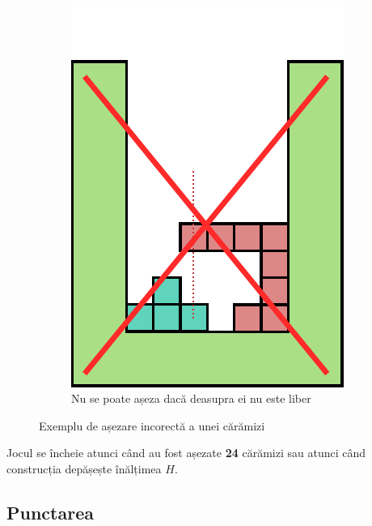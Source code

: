 \documentclass[12pt]{article}
\begin{document}
\begin{figure}[h!]
\begin{subfigure}[t]{0.25\textwidth}
        \end{subfigure}%
        \qquad
        ~ %
        \begin{subfigure}[t]{0.25\textwidth}
                \includegraphics[width=\textwidth]{graphics/placenewB.pdf}
                \caption{Nu se poate așeza dacă deasupra ei nu este liber}
                \label{fig:incorrectB}
        \end{subfigure}%
        \caption{Exemplu de așezare incorectă a unei cărămizi}%
        \label{fig:incorrect}%
\end{figure}

Jocul se încheie atunci când au fost așezate \textbf{24} cărămizi sau
atunci când construcția depășește înălțimea $H$.

\subsection{Punctarea}
\label{sec:scoring}
\end{document}
